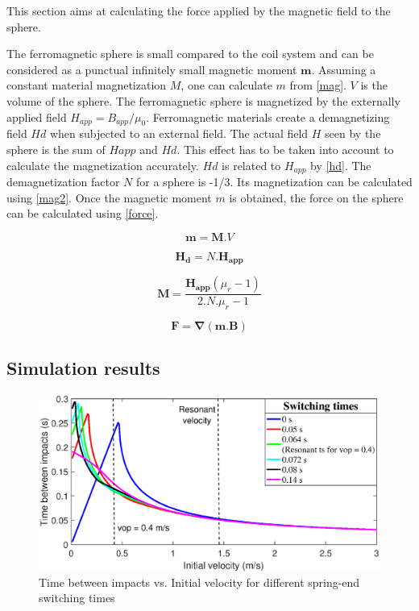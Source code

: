 \documentclass[letterpaper, 10 pt, conference]{ieeeconf}  %
\begin{document}
This section aims at calculating the force applied by the magnetic field to the sphere.\par
The ferromagnetic sphere is small compared to the coil system and can be considered as a punctual infinitely small magnetic moment $\mathbf{m}$. Assuming a constant material magnetization $M$, one can calculate $m$ from \ref{mag}. $V$ is the volume of the sphere.
The ferromagnetic sphere is magnetized by the externally applied field $H_{app}=B_{app}/\mu_0$. Ferromagnetic materials create a demagnetizing field $Hd$ when subjected to an external field. The actual field $H$ seen by the sphere is the sum of $Happ$ and $Hd$. This effect has to be taken into account to calculate the magnetization accurately. $Hd$ is related to $H_{app}$ by \ref{hd}. The demagnetization factor $N$ for a sphere is -1/3. Its magnetization can be calculated using \ref{mag2}.
Once the magnetic moment $m$ is obtained, the force on the sphere can be calculated using \ref{force}.

\begin{equation}
\mathbf{m}=\mathbf{M}.V
\label{mag}
\end{equation}

\begin{equation}
\mathbf{H_d}=N.\mathbf{H_{app}}
\label{hd}
\end{equation}

\begin{equation}
\mathbf{M}=\frac{\mathbf{H_{app}}\left ( \mu_r-1  \right )}{2.N.\mu_r-1}
\label{mag2}
\end{equation}

\begin{equation}
\mathbf{F}=\mathbf{\nabla}(\mathbf{m}.\mathbf{B})
\label{force}
\end{equation}

\subsection{Simulation results}

\begin{figure}
	\includegraphics[width=\linewidth]{delTvsVop_R2.eps}
	\caption{Time between impacts vs. Initial velocity for different spring-end switching times}
	\label{delTvsVop}
\end{figure}
\end{document}
